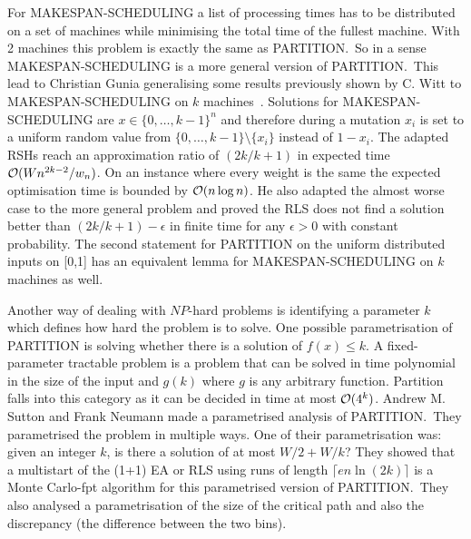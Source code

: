 For MAKESPAN-SCHEDULING a list of processing times has to be distributed on a set of machines while minimising the total time of the fullest machine.
With 2 machines this problem is exactly the same as PARTITION.\
So in a sense MAKESPAN-SCHEDULING is a more general version of PARTITION.\
This lead to Christian Gunia generalising some results previously shown by C. Witt to MAKESPAN-SCHEDULING on $k$ machines~\cite{gunia2005analysis}.
Solutions for MAKESPAN-SCHEDULING are \(x\in{\{0,\dots,k-1\}}^n\) and therefore during a mutation $x_i$ is set to a uniform random value from $\{0,\dots,k-1\}\text{\textbackslash}\{x_i\}$ instead of $1-x_i$.
The adapted RSHs reach an approximation ratio of $(2k/k+1)$ in expected time $\mathcal{O}(Wn^{2k-2}/w_n)$.
On an instance where every weight is the same the expected optimisation time is bounded by $\mathcal{O}(n\log{n})$.
He also adapted the almost worse case to the more general problem and proved the RLS does not find a solution better than \((2k/k+1)-\epsilon\) in finite time for any $\epsilon>0$ with constant probability.
The second statement for PARTITION on the uniform distributed inputs on [0,1] has an equivalent lemma for MAKESPAN-SCHEDULING on $k$ machines as well.

Another way of dealing with $NP$-hard problems is identifying a parameter $k$ which defines how hard the problem is to solve.
One possible parametrisation of PARTITION is solving whether there is a solution of $f(x)\le k$.
A fixed-parameter tractable problem is a problem that can be solved in time polynomial in the size of the input and $g(k)$ where $g$ is any arbitrary function.
Partition falls into this category as it can be decided in time at most $\mathcal{O}(4^k)$\cite{fernau2005parameterized}.
Andrew M. Sutton and Frank Neumann made a parametrised analysis of PARTITION\cite{sutton2012parameterized}.\
They parametrised the problem in multiple ways.
One of their parametrisation was: given an integer $k$, is there a solution of at most $W/2+W/k$?
They showed that a multistart of the (1+1) EA or RLS using runs of length \(\lceil en\ln(2k)\rceil\) is a Monte Carlo-fpt algorithm for this parametrised version of PARTITION.\
They also analysed a parametrisation of the size of the critical path and also the discrepancy (the difference between the two bins).

